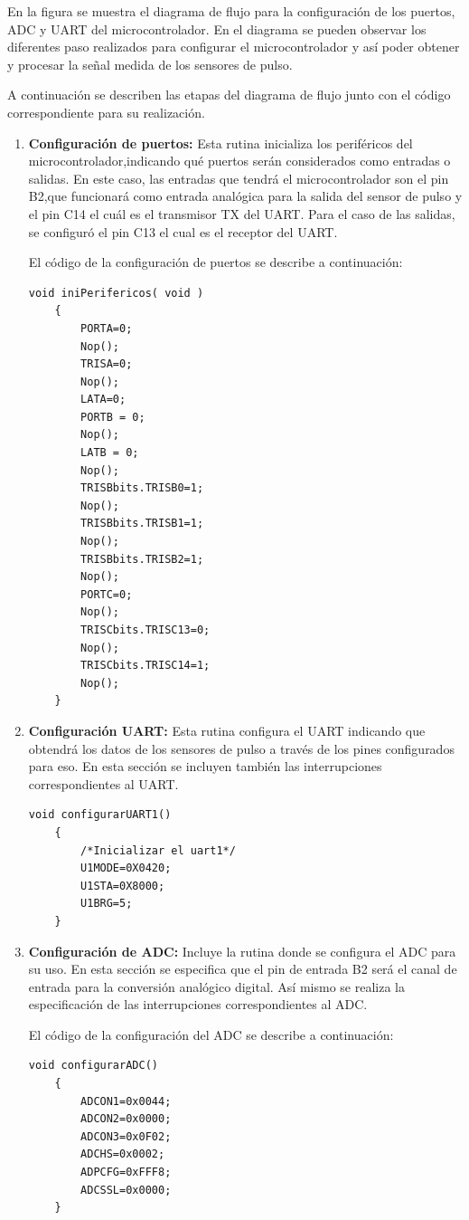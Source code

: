 En la figura se muestra el diagrama de flujo para la configuración de los puertos, ADC y UART del microcontrolador. En el diagrama se pueden observar los diferentes paso realizados para configurar el microcontrolador y así poder obtener y procesar la señal medida de los sensores de pulso.

A continuación se describen las etapas del diagrama de flujo junto con el código correspondiente para su realización.

\begin{enumerate}
	\item \textbf{Configuración de puertos:} Esta rutina inicializa los periféricos del microcontrolador,indicando qué puertos serán considerados como entradas o salidas. En este caso, las entradas que tendrá el microcontrolador son el pin B2,que funcionará como entrada analógica para la salida del sensor de pulso y el pin C14 el cuál es el transmisor TX del UART. Para el caso de las salidas, se configuró el pin C13 el cual es el receptor del UART. 
	
	\lstset{language=c}
	El código de la configuración de puertos se describe a continuación:
	\begin{lstlisting}[frame=single]
	void iniPerifericos( void )
	{
        PORTA=0;
		Nop();
		TRISA=0;
		Nop();
		LATA=0;
		PORTB = 0;
		Nop();
		LATB = 0;
		Nop();
		TRISBbits.TRISB0=1;
		Nop();
		TRISBbits.TRISB1=1;
		Nop();
		TRISBbits.TRISB2=1;
		Nop();
		PORTC=0;
		Nop();
		TRISCbits.TRISC13=0;
		Nop();
		TRISCbits.TRISC14=1;
		Nop();
	}
	\end{lstlisting}
	
	
	\item \textbf{Configuración UART:} Esta rutina configura el UART indicando que obtendrá los datos de los sensores de pulso a través de los pines configurados para eso. En esta sección se incluyen también las interrupciones correspondientes al UART.
	\begin{lstlisting}[frame=single]
	void configurarUART1()
	{
		/*Inicializar el uart1*/
		U1MODE=0X0420;
		U1STA=0X8000;
		U1BRG=5;
	}
	\end{lstlisting}
	
	\item \textbf{Configuración de ADC:} Incluye la rutina donde se configura el ADC para su uso. En esta sección se especifica que el pin de entrada B2 será el canal de entrada para la conversión analógico digital. Así mismo se realiza la especificación de las interrupciones correspondientes al ADC.
	
	\lstset{language=c}
	El código de la configuración del ADC se describe a continuación:
	\begin{lstlisting}[frame=single]
	void configurarADC()
	{
		ADCON1=0x0044;
		ADCON2=0x0000;
		ADCON3=0x0F02;
		ADCHS=0x0002;
		ADPCFG=0xFFF8;
		ADCSSL=0x0000;
	}
	\end{lstlisting}

\end{enumerate}

